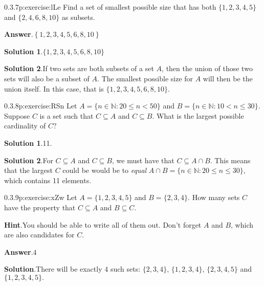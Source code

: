 \documentclass[twoside,11pt,]{book}
\newcommand{\blocktitlefont}{\relax}
\numberwithin{equation}{chapter}
\newcommand{\N}{\mathbb N}
\newcommand{\st}{:}
\newcommand{\lt}{<}
\begin{document}
\begin{divisionsolution}{0.3.7}{}{p:exercise:lLe}%
Find a set of smallest possible size that has both \(\{1,2,3,4,5\}\) and \(\{2,4,6,8,10\}\) as subsets.%
\par\smallskip%
\noindent\textbf{\blocktitlefont Answer}.\quad{}\(\left\{1,2,3,4,5,6,8,10\right\}\)%
\par\smallskip%
\noindent\textbf{\blocktitlefont Solution 1}.\quad{}\(\{1,2,3,4,5,6,8,10\}\)%
\par\smallskip%
\noindent\textbf{\blocktitlefont Solution 2}.\quad{}If two sets are both subsets of a set \(A\text{,}\) then the union of those two sets will also be a subset of \(A\text{.}\) The smallest possible size for \(A\) will then be the union itself. In this case, that is \(\{1,2,3,4,5,6,8,10\}\text{.}\)%
\end{divisionsolution}%
\begin{divisionsolution}{0.3.8}{}{p:exercise:RSn}%
Let \(A = \{n \in \N \st 20 \le n \lt 50\}\) and \(B = \{n \in \N \st 10 \lt n \le 30\}\text{.}\) Suppose \(C\) is a set such that \(C \subseteq A\) and \(C \subseteq B\text{.}\) What is the largest possible cardinality of \(C\text{?}\)%
\par\smallskip%
\noindent\textbf{\blocktitlefont Solution 1}.\quad{}11.%
\par\smallskip%
\noindent\textbf{\blocktitlefont Solution 2}.\quad{}For \(C \subseteq A\) and \(C \subseteq B\text{,}\) we must have that \(C \subseteq A \cap B\text{.}\) This means that the largest \(C\) could be would be to \emph{equal} \(A \cap B = \{n \in \N \st 20 \le n \le 30\}\text{,}\) which contains 11 elements.%
\end{divisionsolution}%
\begin{divisionsolution}{0.3.9}{}{p:exercise:xZw}%
Let \(A = \{1,2,3,4,5\}\) and \(B = \{2, 3, 4\}\text{.}\) How many sets \(C\) have the property that \(C \subseteq A\) and \(B \subseteq C\text{.}\)%
\par\smallskip%
\noindent\textbf{\blocktitlefont Hint}.\quad{}You should be able to write all of them out. Don't forget \(A\) and \(B\text{,}\) which are also candidates for \(C\text{.}\)%
\par\smallskip%
\noindent\textbf{\blocktitlefont Answer}.\quad{}\(4\)%
\par\smallskip%
\noindent\textbf{\blocktitlefont Solution}.\quad{}There will be exactly 4 such sets: \(\{2, 3, 4\}\text{,}\) \(\{1,2,3,4\}\text{,}\) \(\{2,3,4,5\}\) and \(\{1,2,3,4,5\}\text{.}\)%
\end{divisionsolution}%
\end{document}
